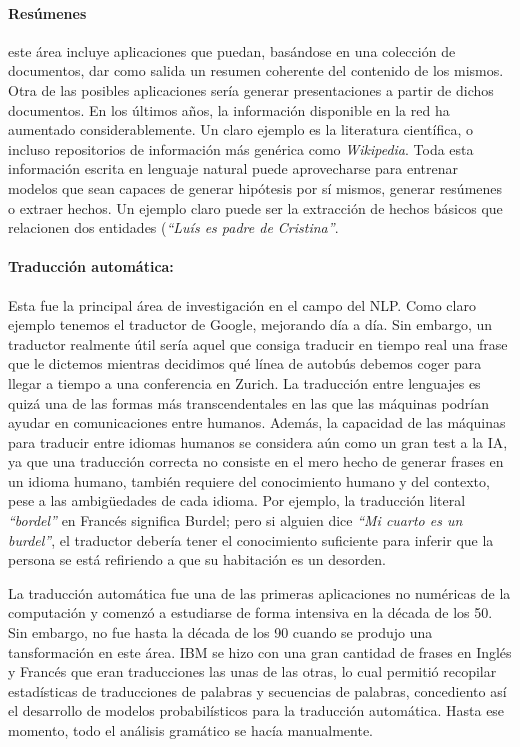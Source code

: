 \paragraph{Resúmenes} este área incluye aplicaciones que puedan, basándose en
una colección de documentos, dar como salida un resumen coherente del contenido
de los mismos. Otra de las posibles aplicaciones sería generar presentaciones a
partir de dichos documentos. En los últimos años, la información disponible en
la red ha aumentado considerablemente. Un claro ejemplo es la literatura
científica, o incluso repositorios de información más genérica como
\emph{Wikipedia}. Toda esta información escrita en lenguaje natural puede
aprovecharse para entrenar modelos que sean capaces de generar hipótesis por sí
mismos, generar resúmenes o extraer hechos. Un ejemplo claro puede ser la
extracción de hechos básicos que relacionen dos entidades (\emph{``Luís es padre
de Cristina''}.

\paragraph{Traducción automática:} Esta fue la principal área de investigación
en el campo del \ac{NLP}. Como claro ejemplo tenemos el traductor de Google,
mejorando día a día. Sin embargo, un traductor realmente útil sería aquel que
consiga traducir en tiempo real una frase que le dictemos mientras decidimos qué
línea de autobús debemos coger para llegar a tiempo a una conferencia en
Zurich. La traducción entre lenguajes es quizá una de las formas más
transcendentales en las que las máquinas podrían ayudar en comunicaciones entre
humanos. Además, la capacidad de las máquinas para traducir entre idiomas
humanos se considera aún como un gran test a la \ac{IA}, ya que una traducción
correcta no consiste en el mero hecho de generar frases en un idioma humano,
también requiere del conocimiento humano y del contexto, pese a las ambigüedades
de cada idioma. Por ejemplo, la traducción literal \emph{``bordel''} en Francés
significa Burdel; pero si alguien dice \emph{``Mi cuarto es un burdel''}, el
traductor debería tener el conocimiento suficiente para inferir que la persona
se está refiriendo a que su habitación es un desorden.

La traducción automática fue una de las primeras aplicaciones no numéricas de la
computación y comenzó a estudiarse de forma intensiva en la década de los
50. Sin embargo, no fue hasta la década de los 90 cuando se produjo una
tansformación en este área. IBM se hizo con una gran cantidad de frases en
Inglés y Francés que eran traducciones las unas de las otras,  lo cual permitió recopilar estadísticas de traducciones de
palabras y secuencias de palabras, concediento así el desarrollo de modelos
probabilísticos para la traducción automática. Hasta ese momento, todo el
análisis gramático se hacía manualmente.

